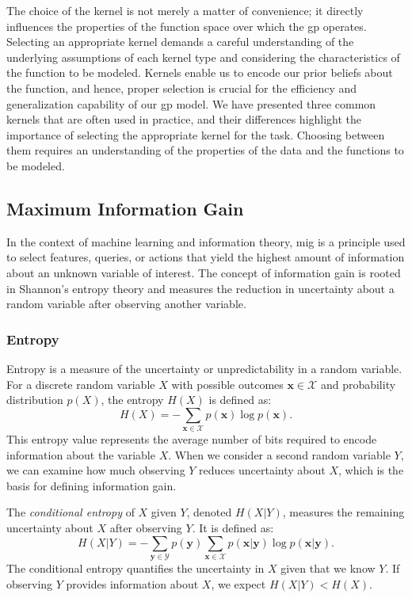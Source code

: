 The choice of the kernel is not merely a matter of convenience; it directly influences the properties of the function space over which the \ac{gp} operates. Selecting an appropriate kernel demands a careful understanding of the underlying assumptions of each kernel type and considering the characteristics of the function to be modeled. Kernels enable us to encode our prior beliefs about the function, and hence, proper selection is crucial for the efficiency and generalization capability of our \ac{gp} model. We have presented three common kernels that are often used in practice, and their differences highlight the importance of selecting the appropriate kernel for the task. Choosing between them requires an understanding of the properties of the data and the functions to be modeled.
\subsection{Maximum Information Gain}
\label{section:MIG}
In the context of machine learning and information theory, \ac{mig} is a principle used to select features, queries, or actions that yield the highest amount of information about an unknown variable of interest. The concept of information gain is rooted in Shannon’s entropy theory and measures the reduction in uncertainty about a random variable after observing another variable. 

\subsubsection{Entropy}
\label{section:entropy}
Entropy is a measure of the uncertainty or unpredictability in a random variable. For a discrete random variable $X$ with possible outcomes $\mathbf{x} \in \mathcal{X}$ and probability distribution $p(X)$, the entropy $H(X)$ is defined as:
\[
H(X) = - \sum_{\mathbf{x} \in \mathcal{X}} p(\mathbf{x}) \log p(\mathbf{x}).
\]
This entropy value represents the average number of bits required to encode information about the variable $X$. When we consider a second random variable $Y$, we can examine how much observing $Y$ reduces uncertainty about $X$, which is the basis for defining information gain.

The \textit{conditional entropy} of $X$ given $Y$, denoted $H(X \vert Y)$, measures the remaining uncertainty about $X$ after observing $Y$. It is defined as:
\[
H(X \vert Y) = - \sum_{\mathbf{y} \in \mathcal{Y}} p(\mathbf{y}) \sum_{\mathbf{x} \in \mathcal{X}} p(\mathbf{x} \vert \mathbf{y}) \log p(\mathbf{x} \vert \mathbf{y}).
\]
The conditional entropy quantifies the uncertainty in $X$ given that we know $Y$. If observing $Y$ provides information about $X$, we expect $H(X \vert Y) < H(X)$.

